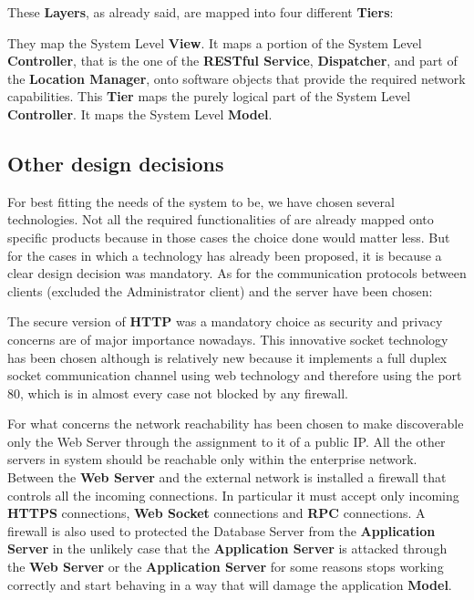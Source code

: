 These \textbf{Layers}, as already said, are mapped into four different \textbf{Tiers}:
\begin{itemize}
	 They map the System Level \textbf{View}.
	 It maps a portion of the System Level \textbf{Controller}, that is the one of the \textbf{RESTful Service}, \textbf{Dispatcher}, and part of the \textbf{Location Manager}, onto software objects that provide the required network capabilities.
	 This \textbf{Tier} maps the purely logical part of the System Level \textbf{Controller}.
	 It maps the System Level \textbf{Model}.
\end{itemize}

\subsection{Other design decisions}
For best fitting the needs of the system to be,  we have chosen several technologies. Not all the required functionalities of \myTaxiService{} are already mapped onto specific products because in those cases the choice done would matter less.
But for the cases in which a technology has already been proposed, it is because a clear design decision was mandatory.
As for the communication protocols between clients (excluded the Administrator client) and the server have been chosen:
\begin{itemize}
	 The secure version of \textbf{HTTP} was a mandatory choice as security and privacy concerns are of major importance nowadays.
	 This innovative socket technology has been chosen although is relatively new because it implements a full duplex socket communication channel using web technology and therefore using the port 80, which is in almost every case not blocked by any firewall.
\end{itemize}
For what concerns the network reachability has been chosen to make discoverable only the Web Server through the assignment to it of a public IP.
All the other servers in \myTaxiService{} system should be reachable only within the enterprise network.
Between the \textbf{Web Server} and the external network is installed a firewall that controls all the incoming connections.
In particular it must accept only incoming \textbf{HTTPS} connections, \textbf{Web Socket} connections and \textbf{RPC} connections.
A firewall is also used to protected the Database Server from the \textbf{Application Server} in the unlikely case that the \textbf{Application Server} is attacked through the \textbf{Web Server} or the \textbf{Application Server} for some reasons stops working correctly and start behaving in a way that will damage the application \textbf{Model}.
